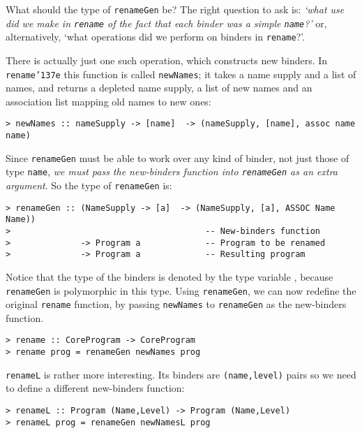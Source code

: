 What should the type of \mbox{\tt renameGen} be?
The right question to ask is: {\em `what use did we make in \mbox{\tt rename}
of the fact that each binder was a simple \mbox{\tt name}?'\/} or, alternatively,
`what operations did we perform on binders in \mbox{\tt rename}?'.

There is actually just one such operation, which constructs
new binders.  In \mbox{\tt rename{\char'137}e}
this function is called \mbox{\tt newNames}; it takes a name supply and
a list of names, and returns a depleted name supply, a list
of new names and an association list mapping old names to
new ones:
\begin{verbatim}
> newNames :: nameSupply -> [name]  -> (nameSupply, [name], assoc name name)
\end{verbatim}
%
Since \mbox{\tt renameGen} must be able to work over any kind of
binder, not just those of type \mbox{\tt name}, {\em we must pass the new-binders
function into \mbox{\tt renameGen} as an extra argument}.
So the type of \mbox{\tt renameGen} is:
\begin{verbatim}
> renameGen :: (NameSupply -> [a]  -> (NameSupply, [a], ASSOC Name Name))
>                                       -- New-binders function
>              -> Program a             -- Program to be renamed
>              -> Program a             -- Resulting program
\end{verbatim}
%
Notice that the type of the binders is denoted by the type variable \mbox{\tt *},
because \mbox{\tt renameGen} is polymorphic in this type.
Using \mbox{\tt renameGen}, we can now redefine the original \mbox{\tt rename} function,
by passing \mbox{\tt newNames} to \mbox{\tt renameGen} as the new-binders function.
\begin{verbatim}
> rename :: CoreProgram -> CoreProgram
> rename prog = renameGen newNames prog
\end{verbatim}
%
%
\par
\mbox{\tt renameL} is rather more interesting.  Its binders are \mbox{\tt (name,level)} pairs
so we need to define a different new-binders function:
\begin{verbatim}
> renameL :: Program (Name,Level) -> Program (Name,Level)
> renameL prog = renameGen newNamesL prog
\end{verbatim}
